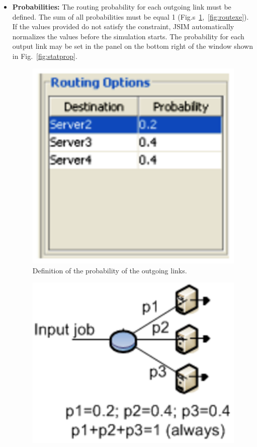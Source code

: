 \begin{itemize}
\item \textbf{Probabilities:} The routing probability for each
outgoing link must be defined. The sum of all probabilities must
be equal 1 (Fig.s~\ref{fig:defprobw},~\ref{fig:routexe}). If the
values provided do not satisfy the constraint, JSIM automatically
normalizes the values before the simulation starts. The
probability for each output link may be set in the panel on the
bottom right of the window shown in Fig.~\ref{fig:statprop}.
\begin{figure}[h!]
    \begin{center}
        \includegraphics[scale=.5]{img/jsimg/8.9.eps}
    \end{center}
    \caption{Definition of the probability of the outgoing links.}
    \label{fig:defprobw}
\end{figure}
\begin{figure}[h!]
    \begin{center}
        \includegraphics[scale=.5]{img/jsimg/8.10.eps}

\end{center}
\end{figure}
\end{itemize}
